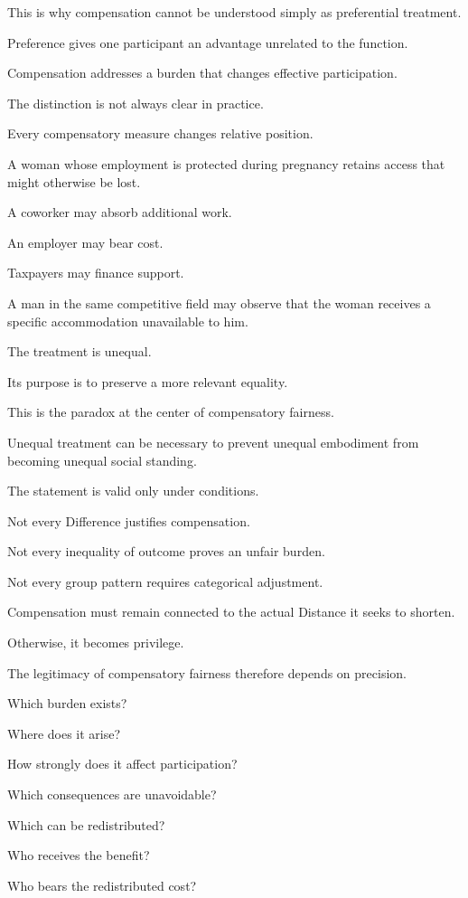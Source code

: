 This is why compensation cannot be understood simply as preferential treatment.

Preference gives one participant an advantage unrelated to the function.

Compensation addresses a burden that changes effective participation.

The distinction is not always clear in practice.

Every compensatory measure changes relative position.

A woman whose employment is protected during pregnancy retains access that might otherwise be lost.

A coworker may absorb additional work.

An employer may bear cost.

Taxpayers may finance support.

A man in the same competitive field may observe that the woman receives a specific accommodation unavailable to him.

The treatment is unequal.

Its purpose is to preserve a more relevant equality.

This is the paradox at the center of compensatory fairness.

Unequal treatment can be necessary to prevent unequal embodiment from becoming unequal social standing.

The statement is valid only under conditions.

Not every Difference justifies compensation.

Not every inequality of outcome proves an unfair burden.

Not every group pattern requires categorical adjustment.

Compensation must remain connected to the actual Distance it seeks to shorten.

Otherwise, it becomes privilege.

The legitimacy of compensatory fairness therefore depends on precision.

Which burden exists?

Where does it arise?

How strongly does it affect participation?

Which consequences are unavoidable?

Which can be redistributed?

Who receives the benefit?

Who bears the redistributed cost?

